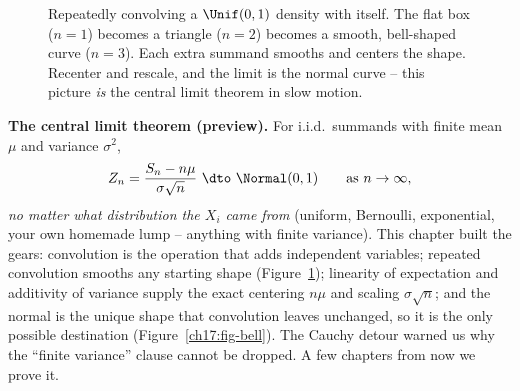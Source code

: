 \begin{figure}[H]
\centering
{}
\caption{Repeatedly convolving a $\Unif(0,1)$ density with itself. The flat
box ($n{=}1$) becomes a triangle ($n{=}2$) becomes a smooth, bell-shaped
curve ($n{=}3$). Each extra summand smooths and centers the shape. Recenter
and rescale, and the limit is the normal curve -- this picture \emph{is}
the central limit theorem in slow motion.}
\label{ch17:fig-clt}
\end{figure}

\begin{aestheticbox}
\textbf{The central limit theorem (preview).} For i.i.d.\ summands with
finite mean $\mu$ and variance $\sigma^2$,
\[
Z_n=\frac{S_n-n\mu}{\sigma\sqrt n}\ \dto\ \Normal(0,1)
\qquad\text{as } n\to\infty,
\]
\emph{no matter what distribution the $X_i$ came from} (uniform, Bernoulli,
exponential, your own homemade lump -- anything with finite variance).
This chapter built the gears: convolution is the operation that adds
independent variables; repeated convolution smooths any starting shape
(Figure~\ref{ch17:fig-clt}); linearity of expectation and additivity of
variance supply the exact centering $n\mu$ and scaling $\sigma\sqrt n$; and
the normal is the unique shape that convolution leaves unchanged, so it is
the only possible destination (Figure~\ref{ch17:fig-bell}). The Cauchy detour warned us why the
``finite variance'' clause cannot be dropped. A few chapters from now we
prove it.
\end{aestheticbox}

